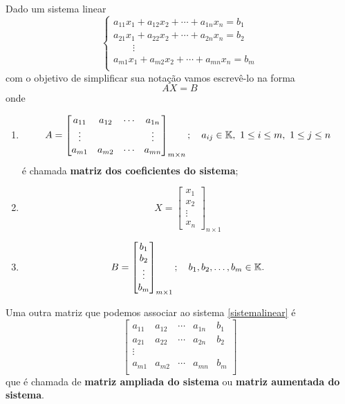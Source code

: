 Dado um sistema linear
\begin{equation}
\begin{cases}
a_{11}x_1 + a_{12}x_2 + \cdots + a_{1n}x_n = b_1\\
a_{21}x_1 + a_{22}x_2 + \cdots + a_{2n}x_n = b_2\\
\qquad \vdots\\
a_{m1}x_1 + a_{m2}x_2 + \cdots + a_{mn}x_n = b_m\\
\end{cases}
\end{equation}
com o objetivo de simplificar sua nota\c{c}\~ao vamos escrev\^e-lo na forma
\begin{equation}\label{formamatricial}
AX = B
\end{equation}
onde
\begin{enumerate}
	\item
	\[
	A = \begin{bmatrix}
	a_{11} & a_{12} & \cdots & a_{1n}\\
	\vdots & & & \vdots\\
	a_{m1} & a_{m2} & \cdots & a_{mn}
	\end{bmatrix}_{m\times n}; \quad a_{ij} \in \cp{K},\ 1 \le i \le m,\ 1 \le j \le n
	\]
	\'e chamada \textbf{matriz dos coeficientes do sistema};
	\item
	\[
	X = \begin{bmatrix}
	x_1\\
	x_2\\
	\vdots\\
	x_n
	\end{bmatrix}_{n \times 1}
	\]
	\item
	\[
	B = \begin{bmatrix}
	b_1\\
	b_2\\
	\vdots\\
	b_m
	\end{bmatrix}_{m \times 1}; \quad b_1, b_2, \dots, b_m \in \mathbb{K}.
	\]
\end{enumerate}

Uma outra matriz que podemos associar ao sistema \eqref{sistemalinear} \'e
\[
\begin{bmatrix}
a_{11} & a_{12} & \cdots & a_{1n} & b_1\\
a_{21} & a_{22} & \cdots & a_{2n} & b_2\\
\vdots\\
a_{m1} & a_{m2} & \cdots & a_{mn} & b_m\\
\end{bmatrix}
\]
que \'e chamada de \textbf{matriz ampliada do sistema} ou \textbf{matriz aumentada do sistema}.

